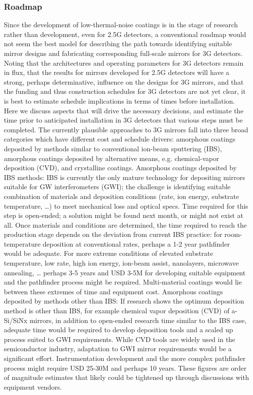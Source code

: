 \subsubsection{Roadmap}
Since the development of low-thermal-noise coatings is in the stage of research rather than development, even for 2.5G detectors, a conventional roadmap would not seem the best model for describing the path towards identifying suitable mirror designs and fabricating corresponding full-scale mirrors for 3G detectors. Noting that the architectures and operating parameters for 3G detectors remain in flux, that the results for mirrors developed for 2.5G detectors will have a strong, perhaps determinative, influence on the designs for 3G mirrors, and that the funding and thus construction schedules for 3G detectors are not yet clear, it is best to estimate schedule implications in terms of times before installation. Here we discuss aspects that will drive the necessary decisions, and estimate the time prior to anticipated installation in 3G detectors that various steps must be completed. 
The currently plausible approaches to 3G mirrors fall into three broad categories which have different cost and schedule drivers: amorphous coatings deposited by methods similar to conventional ion-beam sputtering (IBS), amorphous coatings deposited by alternative means, e.g. chemical-vapor deposition (CVD), and crystalline coatings. 
Amorphous coatings deposited by IBS methods: IBS is currently the only mature technology for depositing mirrors suitable for GW interferometers (GWI); the challenge is identifying suitable combination of materials and deposition conditions (rate, ion energy, substrate temperature, …) to meet mechanical loss and optical specs. Time required for this step is open-ended; a solution might be found next month, or might not exist at all. Once materials and conditions are determined, the time required to reach the production stage depends on the deviation from current IBS practice: for room-temperature deposition at conventional rates, perhaps a 1-2 year pathfinder would be adequate. For more extreme conditions of elevated substrate temperature, low rate, high ion energy, ion-beam assist, nanolayers, microwave annealing, … perhaps 3-5 years and USD 3-5M for developing suitable equipment and the pathfinder process might be required. Multi-material coatings would lie between these extremes of time and equipment cost. 
Amorphous coatings deposited by methods other than IBS: If research shows the optimum  deposition method is other than IBS, for example chemical vapor deposition (CVD) of a-Si/SiNx mirrors, in addition to open-ended research time similar to the IBS case, adequate time would be required to develop deposition tools and a scaled up process suited to GWI requirements. While CVD tools are widely used in the semiconductor industry, adaptation to GWI mirror requirements would be a significant effort. Instrumentation development and the more complex pathfinder process might require  USD 25-30M and perhaps 10 years. These figures are order of magnitude estimates that likely could be tightened up through discussions with equipment vendors. 
